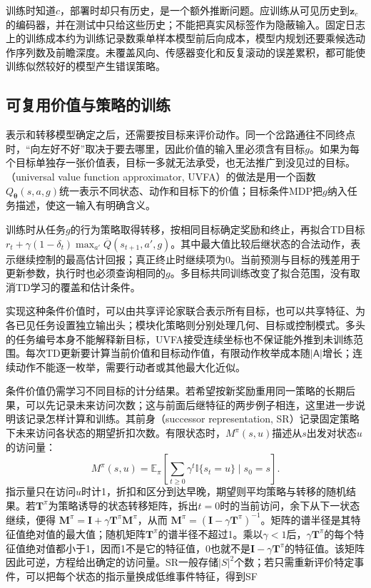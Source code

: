 训练时知道$c$，部署时却只有历史，是一个额外推断问题。应训练从可见历史到$\bm z_c$的编码器，并在测试中只给这些历史；不能把真实风标签作为隐蔽输入。固定日志上的训练成本约为训练记录数乘单样本模型前后向成本，模型内规划还要乘候选动作序列数及前瞻深度。未覆盖风向、传感器变化和反复滚动的误差累积，都可能使训练似然较好的模型产生错误策略。

\subsection{可复用价值与策略的训练}
\label{sec:rl-transfer-value-training}

表示和转移模型确定之后，还需要按目标来评价动作。同一个岔路通往不同终点时，“向左好不好”取决于要去哪里，因此价值的输入里必须含有目标$g$。如果为每个目标单独存一张价值表，目标一多就无法承受，也无法推广到没见过的目标。（universal value function approximator, UVFA）的做法是用一个函数$Q_{\bm\theta}(s,a,g)$统一表示不同状态、动作和目标下的价值；目标条件MDP把$g$纳入任务描述，使这一输入有明确含义。

训练时从任务$g$的行为策略取得转移，按相同目标确定奖励和终止，再拟合TD目标$r_t+\gamma(1-\delta_t)\max_{a'}\overline Q(s_{t+1},a',g)$。其中最大值比较后继状态的合法动作，表示继续控制的最高估计回报；真正终止时继续项为0。当前预测与目标的残差用于更新参数，执行时也必须查询相同的$g$。多目标共同训练改变了拟合范围，没有取消TD学习的覆盖和估计条件。

实现这种条件价值时，可以由共享评论家联合表示所有目标，也可以共享特征、为各已见任务设置独立输出头；模块化策略则分别处理几何、目标或控制模式。多头的任务编号本身不能解释新目标，UVFA接受连续坐标也不保证能外推到未训练范围。每次TD更新要计算当前价值和目标动作值，有限动作枚举成本随$|\mathsf A|$增长；连续动作不能逐一枚举，需要行动者或其他最大化近似。

条件价值仍需学习不同目标的计分结果。若希望按新奖励重用同一策略的长期后果，可以先记录未来访问次数；这与前面后继特征的两步例子相连，这里进一步说明该记录怎样计算和训练。其前身（successor representation, SR）记录固定策略下未来访问各状态的期望折扣次数。有限状态时，$M^\pi(s,u)$描述从$s$出发对状态$u$的访问量：
\[
 M^\pi(s,u)=\mathbb E_\pi\!\left[\sum_{t\geq0}\gamma^t
       \mathbb I\{s_t=u\}\mid s_0=s\right].
\]
指示量只在访问$u$时计1，折扣和区分到达早晚，期望则平均策略与转移的随机结果。若$\bm T^\pi$为策略诱导的状态转移矩阵，拆出$t=0$时的当前访问，余下从下一状态继续，便得
$\bm M^\pi=\bm I+\gamma\bm T^\pi\bm M^\pi$，从而
$\bm M^\pi=(\bm I-\gamma\bm T^\pi)^{-1}$。矩阵的谱半径是其特征值绝对值的最大值；随机矩阵$\bm T^\pi$的谱半径不超过1。乘以$\gamma<1$后，$\gamma\bm T^\pi$的每个特征值绝对值都小于1，因而1不是它的特征值，0也就不是$\bm I-\gamma\bm T^\pi$的特征值。该矩阵因此可逆，方程给出确定的访问量。SR一般存储$|S|^2$个数；若只需重新评价特定事件，可以把每个状态的指示量换成低维事件特征，得到SF

